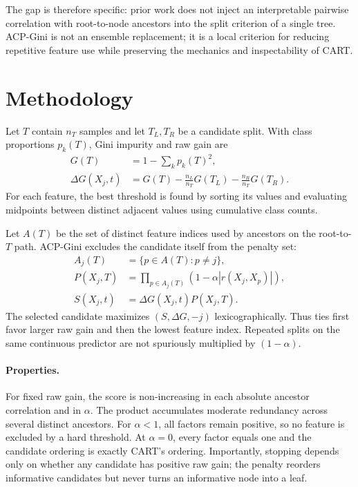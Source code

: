 \documentclass[runningheads]{llncs}
\begin{document}
The gap is therefore specific: prior work does not inject an interpretable pairwise correlation with root-to-node ancestors into the split criterion of a single tree. ACP-Gini is not an ensemble replacement; it is a local criterion for reducing repetitive feature use while preserving the mechanics and inspectability of CART.

\section{Methodology}
Let $T$ contain $n_T$ samples and let $T_L,T_R$ be a candidate split. With class proportions $p_k(T)$, Gini impurity and raw gain are
\begin{align}
G(T)&=1-\sum_k p_k(T)^2,\\
\Delta G(X_j,t)&=G(T)-\frac{n_L}{n_T}G(T_L)-\frac{n_R}{n_T}G(T_R).
\end{align}
For each feature, the best threshold is found by sorting its values and evaluating midpoints between distinct adjacent values using cumulative class counts.

Let $A(T)$ be the set of distinct feature indices used by ancestors on the root-to-$T$ path. ACP-Gini excludes the candidate itself from the penalty set:
\begin{align}
A_j(T)&=\{p\in A(T):p\neq j\},\\
P(X_j,T)&=\prod_{p\in A_j(T)}\left(1-\alpha |r(X_j,X_p)|\right),\\
S(X_j,t)&=\Delta G(X_j,t)P(X_j,T).
\end{align}
The selected candidate maximizes $(S,\Delta G,-j)$ lexicographically. Thus ties first favor larger raw gain and then the lowest feature index. Repeated splits on the same continuous predictor are not spuriously multiplied by $(1-\alpha)$.

\paragraph{Properties.} For fixed raw gain, the score is non-increasing in each absolute ancestor correlation and in $\alpha$. The product accumulates moderate redundancy across several distinct ancestors. For $\alpha<1$, all factors remain positive, so no feature is excluded by a hard threshold. At $\alpha=0$, every factor equals one and the candidate ordering is exactly CART's ordering. Importantly, stopping depends only on whether any candidate has positive raw gain; the penalty reorders informative candidates but never turns an informative node into a leaf.
\end{document}
